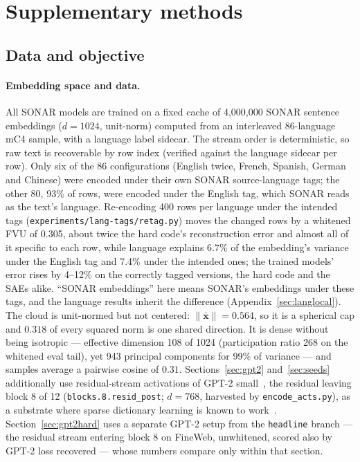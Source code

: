 \section{Supplementary methods}
\label{app:methods}

\subsection{Data and objective}
\label{app:data}

\paragraph{Embedding space and data.}
All SONAR models are trained on a fixed cache of 4{,}000{,}000
SONAR sentence embeddings ($d{=}1024$, unit-norm) computed from an
interleaved 86-language mC4 sample, with a language label sidecar. The
stream order is deterministic, so raw text is recoverable by row index
(verified against the language sidecar per row). Only six of the 86
configurations (English twice, French, Spanish, German and Chinese) were
encoded under their own SONAR source-language tags; the other 80, 93\%
of rows, were encoded under the English tag, which SONAR reads as the
text's language. Re-encoding 400 rows per language under the intended
tags (\texttt{experiments/lang-tags/retag.py}) moves the changed rows by
a whitened FVU of 0.305, about twice the hard code's reconstruction
error and almost all of it specific to each row, while language explains
6.7\% of the embedding's variance under the English tag and 7.4\% under
the intended ones; the trained models' error rises by 4--12\% on the
correctly tagged versions, the hard code and the SAEs alike. ``SONAR
embeddings'' here means SONAR's embeddings under these tags, and the
language results inherit the difference (Appendix~\ref{sec:langlocal}). The cloud is unit-normed
but not centered: $\lVert\bar{\mathbf{x}}\rVert = 0.564$, so it is a
spherical cap and $0.318$ of every squared norm is one shared direction.
It is dense without being isotropic --- effective dimension 108 of 1024
(participation ratio 268 on the whitened eval tail), yet 943 principal
components for 99\% of variance --- and samples average a pairwise cosine
of $0.31$. Sections~\ref{sec:gpt2} and~\ref{sec:seeds} additionally use
residual-stream activations of GPT-2 small~\cite{radford2019}, the
residual leaving block 8 of 12 (\texttt{blocks.8.resid\_post};
$d{=}768$, harvested by \texttt{encode\_acts.py}), as a substrate where
sparse dictionary learning is known to work~\cite{gao2024}.
Section~\ref{sec:gpt2hard} uses a
separate GPT-2 setup from the \texttt{headline} branch --- the residual
stream entering block 8 on FineWeb, unwhitened, scored also by GPT-2 loss
recovered --- whose numbers compare only within that section.

